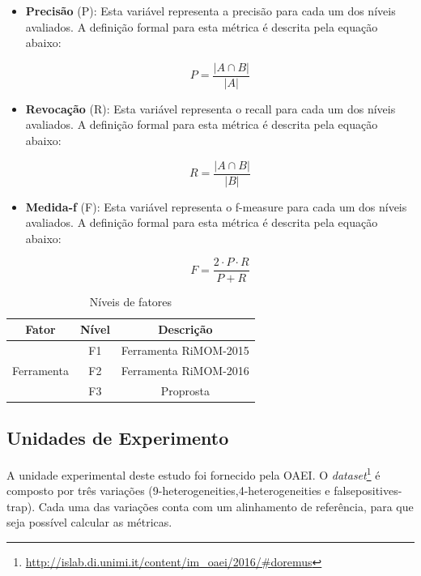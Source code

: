 \begin{itemize}
\item \textbf{Precisão} (P): Esta variável representa a precisão para cada um dos níveis avaliados. A definição formal para esta métrica é descrita pela equação abaixo:

\begin{equation}
P = \dfrac{|{A}\cap{B}|}{|A|}
\end{equation}

\item \textbf{Revocação} (R): Esta variável representa o recall para cada um dos níveis avaliados. A definição formal para esta métrica é descrita pela equação abaixo:

\begin{equation}
R = \dfrac{|{A}\cap{B}|}{|B|}
\end{equation}

\item \textbf{Medida-f} (F): Esta variável representa o f-measure para cada um dos níveis avaliados. A definição formal para esta métrica é descrita pela equação abaixo:

\begin{equation}
F = \dfrac{{2}\cdot{P}\cdot{R}}{P+R}
\end{equation}

\end{itemize}

\begin{table}[]
\centering
\caption{Níveis de fatores}
\label{tab:factor_levels}
\begin{tabular}{|c|c|c|}
\hline
\textbf{Fator}              & \textbf{Nível} & \textbf{Descrição}    \\ \hline
\multirow{3}{*}{Ferramenta} & F1             & Ferramenta RiMOM-2015 \\ \cline{2-3} 
                            & F2             & Ferramenta RiMOM-2016     \\ \cline{2-3} 
                            & F3             & Proprosta             \\ \hline
\end{tabular}
\end{table}

\subsection{Unidades de Experimento}
A unidade experimental deste estudo foi fornecido pela OAEI. O \textit{dataset}\footnote{\url{http://islab.di.unimi.it/content/im_oaei/2016/\#doremus}} é composto por três variações (9-heterogeneities,4-heterogeneities e falsepositives-trap). Cada uma das variações conta com um alinhamento de referência, para que seja possível calcular as métricas.

